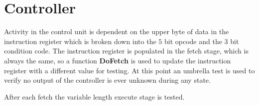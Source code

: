 
\section{Controller}

Activity in the control unit is dependent on the upper byte of data in the instruction register which is broken down into the $5$ bit opcode and the $3$ bit condition code.  
The instruction register is populated in the fetch stage, which is always the same, so a function \textbf{DoFetch} is used to update the instruction register with a different value for testing.
At this point an umbrella test is used to verify no output of the controller is ever unknown during any state.

After each fetch the variable length execute stage is tested.


%







